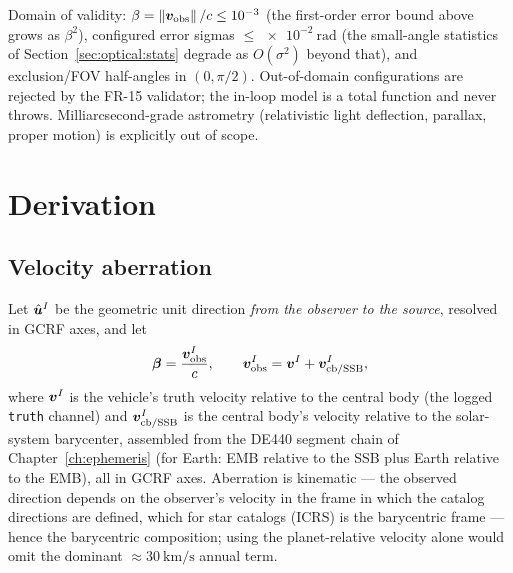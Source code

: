Domain of validity: $\beta = \left\lVert \bm{v}_{\mathrm{obs}} \right\rVert/c \le 10^{-3}$
(the first-order error bound above grows as $\beta^2$), configured error
sigmas $\le \qty{e-2}{\radian}$ (the small-angle statistics of
Section~\ref{sec:optical:stats} degrade as $O(\sigma^2)$ beyond that),
and exclusion/FOV half-angles in $(0, \pi/2)$. Out-of-domain
configurations are rejected by the FR-15 validator; the in-loop model is
a total function and never throws. Milliarcsecond-grade astrometry
(relativistic light deflection, parallax, proper motion) is explicitly
out of scope.

\section{Derivation}
\label{sec:optical:derivation}

\subsection{Velocity aberration}
\label{sec:optical:aberration}

Let $\hat{\bm{u}}^{I}$ be the geometric unit direction \emph{from the
observer to the source}, resolved in GCRF axes, and let
\begin{equation}
  \bm{\beta} = \frac{\bm{v}_{\mathrm{obs}}^{I}}{c},
  \qquad
  \bm{v}_{\mathrm{obs}}^{I} = \bm{v}^{I}
    + \bm{v}_{\mathrm{cb}/\mathrm{SSB}}^{I},
  \label{eq:optical:beta}
\end{equation}
where $\bm{v}^{I}$ is the vehicle's truth velocity relative to the
central body (the logged \texttt{truth} channel) and
$\bm{v}_{\mathrm{cb}/\mathrm{SSB}}^{I}$ is the central body's velocity
relative to the solar-system barycenter, assembled from the DE440
segment chain of Chapter~\ref{ch:ephemeris} (for Earth: EMB relative to
the SSB plus Earth relative to the EMB), all in GCRF axes. Aberration is
kinematic --- the observed direction depends on the observer's velocity
in the frame in which the catalog directions are defined, which for
star catalogs (ICRS) is the barycentric frame --- hence the barycentric
composition; using the planet-relative velocity alone would omit the
dominant $\approx \qty{30}{\kilo\metre\per\second}$ annual term.

